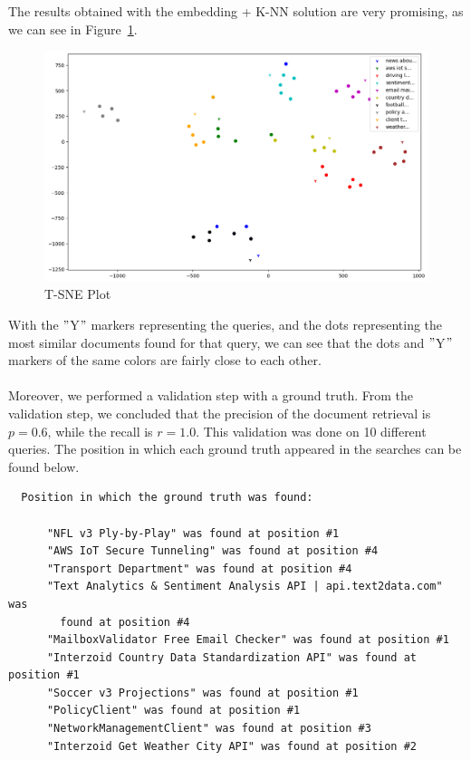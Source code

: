 The results obtained with the embedding + K-NN solution are very promising, as we can see in Figure~\ref{fig:tSNE-plot}.
\begin{figure}
    \centering
    \includegraphics[width=13cm]{../out/plots/SNE}
    \caption{T-SNE Plot}
    \label{fig:tSNE-plot}
\end{figure}
With the \("\)Y\("\) markers representing the queries, and the dots representing the most similar documents found for that query, we can see that the dots and \("\)Y\("\) markers of the same colors are fairly close to each other. \\ \\
Moreover, we performed a validation step with a ground truth.
From the validation step, we concluded that the precision of the document retrieval is $p = 0.6$, while the recall is $r = 1.0$.
This validation was done on 10 different queries.
The position in which each ground truth appeared in the searches can be found below.
\begin{verbatim}
  Position in which the ground truth was found:

      "NFL v3 Ply-by-Play" was found at position #1
      "AWS IoT Secure Tunneling" was found at position #4
      "Transport Department" was found at position #4
      "Text Analytics & Sentiment Analysis API | api.text2data.com" was
        found at position #4
      "MailboxValidator Free Email Checker" was found at position #1
      "Interzoid Country Data Standardization API" was found at position #1
      "Soccer v3 Projections" was found at position #1
      "PolicyClient" was found at position #1
      "NetworkManagementClient" was found at position #3
      "Interzoid Get Weather City API" was found at position #2
\end{verbatim}
